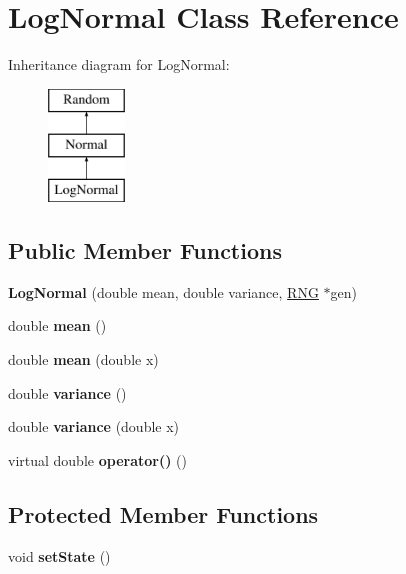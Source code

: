 \hypertarget{classLogNormal}{}\section{Log\+Normal Class Reference}
\label{classLogNormal}
Inheritance diagram for Log\+Normal\+:\begin{figure}[H]
\begin{center}
\leavevmode
\includegraphics[height=3.000000cm]{classLogNormal}
\end{center}
\end{figure}
\subsection*{Public Member Functions}
\begin{DoxyCompactItemize}
\item 
\mbox{\label{classLogNormal_a997a8254223fdd5d0cb2b5d0cdcbbac3}} 
{\bfseries Log\+Normal} (double mean, double variance, \hyperlink{classRNG}{R\+NG} $\ast$gen)
\item 
\mbox{\label{classLogNormal_ace81c6117251f9624f9919efc78dc800}} 
double {\bfseries mean} ()
\item 
\mbox{\label{classLogNormal_afc0a39c7bfb669065d6af7949d68823c}} 
double {\bfseries mean} (double x)
\item 
\mbox{\label{classLogNormal_afcb8d5c3bd0fce94326501c8ac133b6f}} 
double {\bfseries variance} ()
\item 
\mbox{\label{classLogNormal_abc5cbea370296cd32254d39f1e059611}} 
double {\bfseries variance} (double x)
\item 
\mbox{\label{classLogNormal_a23c4f82e41aa47bf8d0a74c2c1bc4062}} 
virtual double {\bfseries operator()} ()
\end{DoxyCompactItemize}
\subsection*{Protected Member Functions}
\begin{DoxyCompactItemize}
\item 
\mbox{\label{classLogNormal_ae4243f850ec1352c16d89db06515cb80}} 
void {\bfseries set\+State} ()
\end{DoxyCompactItemize}
